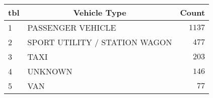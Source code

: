 \begin{table}[!tbp]
\begin{center}
\begin{tabular}{llr}
\hline\hline
\multicolumn{1}{l}{tbl}&\multicolumn{1}{c}{Vehicle Type}&\multicolumn{1}{c}{Count}\tabularnewline
\hline
1&PASSENGER VEHICLE&$1137$\tabularnewline
2&SPORT UTILITY / STATION WAGON&$ 477$\tabularnewline
3&TAXI&$ 203$\tabularnewline
4&UNKNOWN&$ 146$\tabularnewline
5&VAN&$  77$\tabularnewline
\hline
\end{tabular}\end{center}
\end{table}
